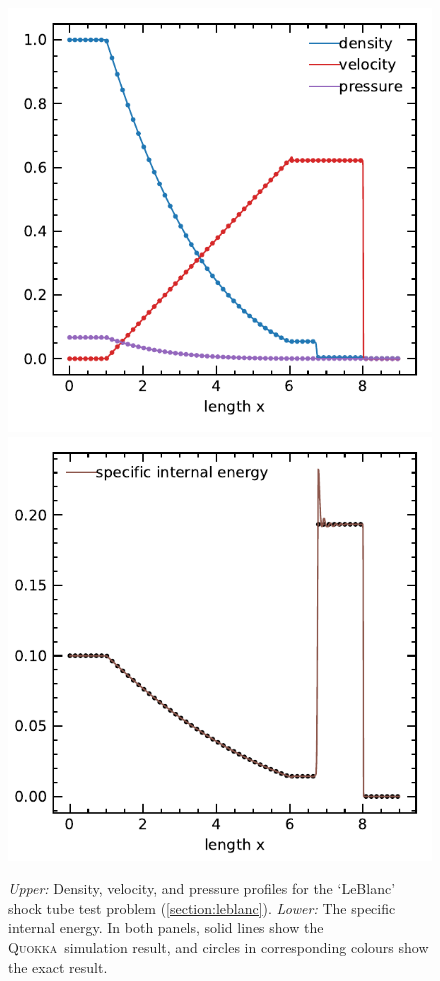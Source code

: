 \documentclass[fleqn,usenatbib]{mnras}
\newcommand{\quokka}{\textsc{Quokka}}
\begin{document}
\begin{figure}
    \includegraphics[width=\columnwidth]{hydro_leblanc_6.0000.pdf}
    \includegraphics[width=\columnwidth]{hydro_leblanc_eint_6.0000.pdf}
    \caption{\emph{Upper:} Density, velocity, and pressure profiles for the `LeBlanc' shock tube test problem (\autoref{section:leblanc}). \emph{Lower:} The specific internal energy. In both panels, solid lines show the \quokka~simulation result, and circles in corresponding colours show the exact result.}
    \label{fig:leblanc}
\end{figure}
\end{document}
